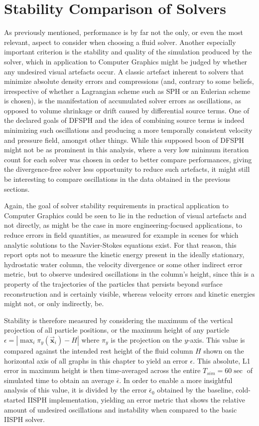 \documentclass[oneside, a4paper]{book}
\newcommand\abs[1]{\left|#1\right|}
\newcommand\vek[1]{\vec{\bm{#1}}}
\newcommand\br[1]{\left(#1\right)}
\begin{document}
  \section{Stability Comparison of Solvers}
  As previously mentioned, performance is by far not the only, or even the most relevant, aspect to consider when choosing a fluid solver. Another especially important criterion is the stability and quality of the simulation produced by the solver, which in application to Computer Graphics might be judged by whether any undesired visual artefacts occur. A classic artefact inherent to solvers that minimize absolute density errors and compressions (and, contrary to some beliefs, irrespective of whether a Lagrangian scheme such as SPH or an Eulerian scheme is chosen), is the manifestation of accumulated solver errors as oscillations, as opposed to volume shrinkage or drift caused by differential source terms. One of the declared goals of DFSPH \autocite{dfsph} and the idea of combining source terms is indeed minimizing such oscillations and producing a more temporally consistent velocity and pressure field, amongst other things. While this supposed boon of DFSPH might not be as prominent in this analysis, where a very low minimum iteration count for each solver was chosen in order to better compare performances, giving the divergence-free solver less opportunity to reduce such artefacts, it might still be interesting to compare oscillations in the data obtained in the previous sections.

  Again, the goal of solver stability requirements in practical application to Computer Graphics could be seen to lie in the reduction of visual artefacts and not directly, as might be the case in more engineering-focused applications, to reduce errors in field quantities, as measured for example in scenes for which analytic solutions to the Navier-Stokes equations exist. For that reason, this report opts not to measure the kinetic energy present in the ideally stationary, hydrostatic water column, the velocity divergence or some other indirect error metric, but to observe undesired oscillations in the column's height, since this is a property of the trajectories of the particles that persists beyond surface reconstruction and is certainly visible, whereas velocity errors and kinetic energies might not, or only indirectly, be. 

  Stability is therefore measured by considering the maximum of the vertical projection of all particle positions, or the maximum height of any particle $\epsilon = \abs{\max_i \pi_y\br{\vek{x}_{i}} - H}$ where $\pi_{y}$ is the projection on the $y$-axis. This value is compared against the intended rest height of the fluid column $H$ shown on the horizontal axis of all graphs in this chapter to yield an error $\epsilon$. This absolute, L1 error in maximum height is then time-averaged across the entire $T_{sim}=60\sec$ of simulated time to obtain an average $\bar{\epsilon}$. In order to enable a more insightful analysis of this value, it is divided by the error $\bar{\epsilon}_0$ obtained by the baseline, cold-started IISPH implementation, yielding an error metric that shows the relative amount of undesired oscillations and instability when compared to the basic IISPH solver.
\end{document}
